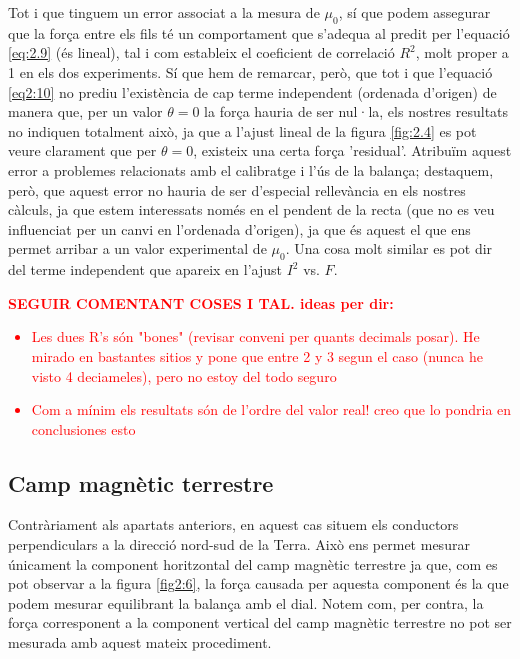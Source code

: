 \documentclass[a4paper,10.5pt]{report}
\begin{document}
Tot i que tinguem un error associat a la mesura de $\mu_0$, sí que podem assegurar que la força entre els fils té un comportament que s'adequa al predit per l'equació \ref{eq:2.9} (és lineal), tal i com estableix el coeficient de correlació $R^2$, molt proper a 1 en els dos experiments. Sí que hem de remarcar, però, que tot i que l'equació \ref{eq2:10} no prediu l'existència de cap terme independent (ordenada d'origen) de manera que, per un valor $\theta = 0$ la força hauria de ser nul·la, els nostres resultats no indiquen totalment això, ja que a l'ajust lineal de la figura \ref{fig:2.4} es pot veure clarament que per $\theta = 0$, existeix una certa força 'residual'. Atribuïm aquest error a problemes relacionats amb el calibratge i l'ús de la balança; destaquem, però, que aquest error no hauria de ser d'especial rellevància en els nostres càlculs, ja que estem interessats només en el pendent de la recta (que no es veu influenciat per un canvi en l'ordenada d'origen), ja que és aquest el que ens permet arribar a un valor experimental de $\mu_0$. Una cosa molt similar es pot dir del terme independent que apareix en l'ajust $I^2$ vs. $F$.

 \textcolor{red}{\textbf{SEGUIR COMENTANT COSES I TAL. ideas per dir:}
 	\begin{itemize}
 		\item Les dues R's són "bones" (revisar conveni per quants decimals posar). He mirado en bastantes sitios y pone que entre 2 y 3 segun el caso (nunca he visto 4 deciameles), pero no estoy del todo seguro
 		\item Com a mínim els resultats són de l'ordre del valor real! creo  que lo pondria en conclusiones esto
 	\end{itemize}}



\subsection{Camp magnètic terrestre}
Contràriament als apartats anteriors, en aquest cas situem els conductors perpendiculars a la direcció nord-sud de la Terra. Això ens permet mesurar únicament la component horitzontal del camp magnètic terrestre ja que, com es pot observar a la figura \ref{fig2:6}, la força causada per aquesta component és la que podem mesurar equilibrant la balança amb el dial. Notem com, per contra, la força corresponent a la component vertical del camp magnètic terrestre no pot ser mesurada amb aquest mateix procediment.
\end{document}
